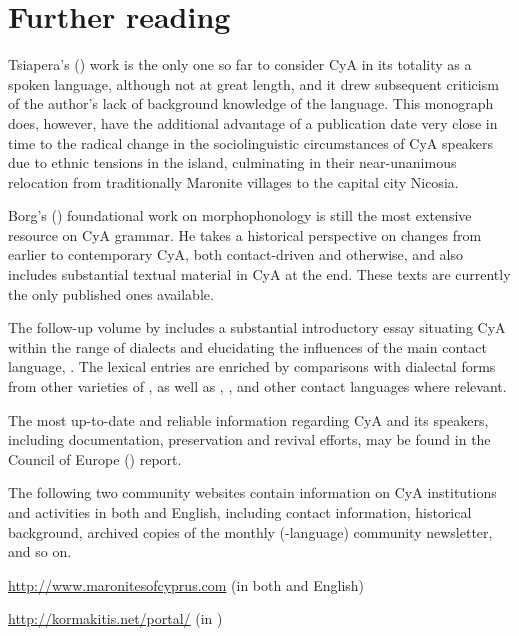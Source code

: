 \documentclass[output=paper]{langsci/langscibook}
\begin{document}
\section*{Further reading}\label{FR}
\begin{furtherreading}
\item[Tsiapera's (\citeyear{Tsiapera1969})] work is the only one so far to consider CyA in its totality as a spoken language, although not at great length, and it drew subsequent criticism of the author’s lack of background knowledge of the  language. This monograph does, however, have the additional advantage of a publication date very close in time to the radical change in the sociolinguistic circumstances of CyA speakers due to ethnic tensions in the island, culminating in their near-unanimous relocation from traditionally Maronite villages to the capital city Nicosia.
\item[Borg's (\citeyear{Borg1985})] foundational work on morphophonology is still the most extensive resource on CyA grammar. He takes a historical perspective on changes from earlier  to contemporary CyA, both contact-driven and otherwise, and also includes substantial textual material in CyA at the end. These texts are currently the only published ones available.
\item[The follow-up volume by \citet{Borg2004}] includes a substantial introductory essay situating CyA within the range of  dialects and elucidating the influences of the main contact language, . The lexical entries are enriched by comparisons with dialectal forms from other varieties of , as well as , , and other contact languages where relevant.
\item[The most up-to-date] and reliable information regarding CyA and its speakers, including documentation, preservation and revival efforts, may be found in the Council of Europe (\citeyear{CouncilofEurope2017}) report.
\end{furtherreading}


The following two community websites contain information on CyA institutions and activities in both  and English, including contact information, historical background, archived copies of the monthly (-language) community newsletter, and so on.

\url{http://www.maronitesofcyprus.com} (in both  and English)


\url{http://kormakitis.net/portal/} (in )
\end{document}
